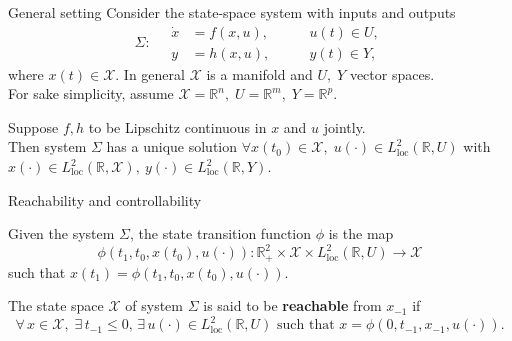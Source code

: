 \documentclass[aspectratio=169]{beamer}
\newcommand{\bbR}{\mathbb{R}}
\begin{document}
\begin{frame}{General setting}
Consider the state-space system  with inputs and outputs
\begin{equation*}
	\Sigma : \quad 
	\begin{aligned}
		\dot{x} &= f(x, u), \\
		y &= h(x,u),
	\end{aligned} \qquad
	\begin{aligned}
		u(t) \in U, \\
		y(t) \in Y,
	\end{aligned}
\end{equation*} 
where $x(t) \in \mathcal{X}$. In general $\mathcal{X}$ is a manifold and $U,\; Y$ vector spaces. \\

For sake simplicity, assume $\mathcal{X} = \bbR^n,\; U=\bbR^m, \; Y=\bbR^p$.

\begin{theorem}
	Suppose $f, h$ to be Lipschitz continuous in $x$ and $u$ jointly. \\
	Then system $\Sigma$ has a unique solution $\forall x(t_0) \in \mathcal{X}, \; u(\cdot) \in L^2_{\text{loc}}(\bbR, U)$ with $x(\cdot) \in L^2_{\text{loc}}(\bbR, \mathcal{X}), \ y(\cdot) \in L^2_{\text{loc}}(\bbR, Y)$.
\end{theorem}

\end{frame}

\begin{frame}{Reachability and controllability}
\begin{overlayarea}{\textwidth}{\textheight}
	
\begin{definition}
		Given the system $\Sigma$, the state transition function $\phi$ is the map 
		\begin{equation*}
			\phi(t_1, t_0, x(t_0), u(\cdot)) : \bbR_+^2 \times \mathcal{X} \times L^{2}_{\text{loc}}(\bbR, U) \rightarrow \mathcal{X}
		\end{equation*}
		such that $x(t_1) = \phi(t_1, t_0, x(t_0), u(\cdot))$. 
\end{definition}


\begin{definition}[Reachability]
		The state space $\mathcal{X}$ of system $\Sigma$ is said to be \textbf{reachable}
		from $x_{-1}$ if 
		\begin{equation*}
		\forall\, x \in \mathcal{X}, \; \exists\,  t_{-1} \le 0, \, \exists\, u(\cdot) \in L^{2}_{\text{loc}}(\bbR, U) \text{ such that } x = \phi(0, t_{-1}, x_{-1}, u(\cdot)).
		\end{equation*}
\end{definition}

\end{overlayarea}

\end{frame}
\end{document}
